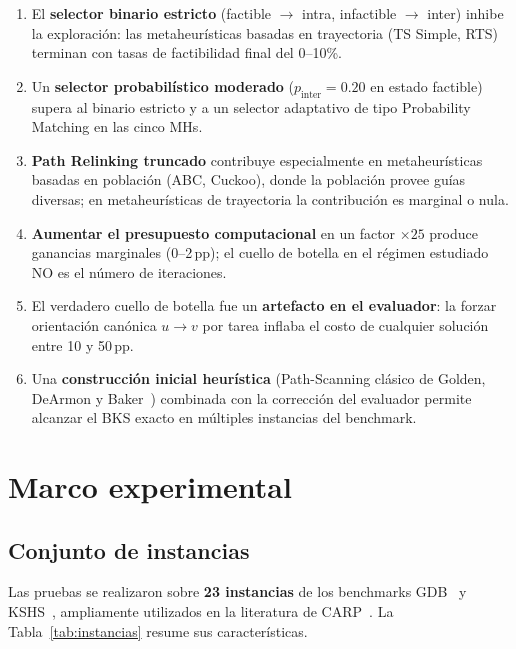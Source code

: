 \begin{enumerate}
\item El \textbf{selector binario estricto} (factible $\to$ intra,
  infactible $\to$ inter) inhibe la exploración: las metaheurísticas
  basadas en trayectoria (TS Simple, RTS) terminan con tasas de
  factibilidad final del 0--10\%.
\item Un \textbf{selector probabilístico moderado} ($p_{\text{inter}}
  = 0.20$ en estado factible) supera al binario estricto y a un
  selector adaptativo de tipo Probability Matching en las cinco MHs.
\item \textbf{Path Relinking truncado} contribuye especialmente en
  metaheurísticas basadas en población (ABC, Cuckoo), donde la
  población provee guías diversas; en metaheurísticas de trayectoria
  la contribución es marginal o nula.
\item \textbf{Aumentar el presupuesto computacional} en un factor
  $\times25$ produce ganancias marginales (0--2\,pp); el cuello de
  botella en el régimen estudiado NO es el número de iteraciones.
\item El verdadero cuello de botella fue un \textbf{artefacto en el
  evaluador}: la forzar orientación canónica $u \to v$ por tarea
  inflaba el costo de cualquier solución entre 10 y 50\,pp.
\item Una \textbf{construcción inicial heurística} (Path-Scanning
  clásico de Golden, DeArmon y Baker~\cite{golden1983}) combinada con la
  corrección del evaluador permite alcanzar el BKS exacto en múltiples
  instancias del benchmark.
\end{enumerate}

\section{Marco experimental}
\label{sec:marco-experimental}

\subsection{Conjunto de instancias}
\label{sec:instancias}

Las pruebas se realizaron sobre \textbf{23 instancias} de los
benchmarks GDB~\cite{golden1983} y KSHS~\cite{kiuchi1995}, ampliamente
utilizados en la literatura de CARP~\cite{golden1981}. La
Tabla~\ref{tab:instancias} resume sus características.

